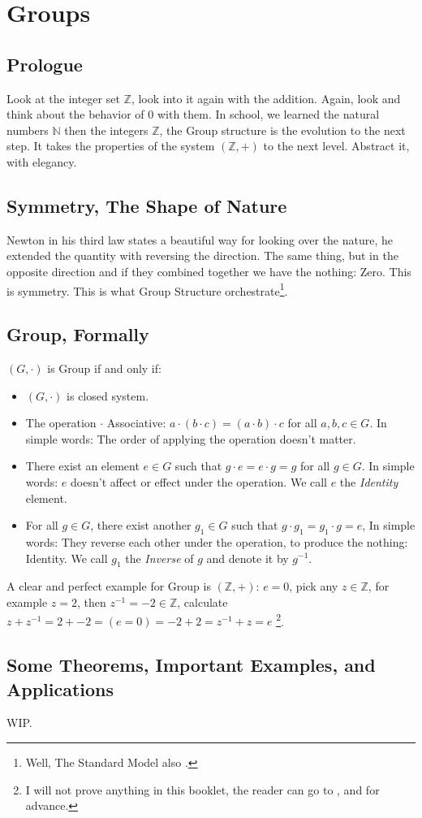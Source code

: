 \section{Groups \label{group}}
\subsection{Prologue}
Look at the integer set $\mathbb{Z}$, look into it again with the addition. Again, look and think about the behavior of $0$ with them. In school, we learned the natural numbers $\mathbb{N}$ then the integers $\mathbb{Z}$, the Group structure is the evolution to the next step. It takes the properties of the system $(\mathbb{Z},+)$ to the next level. Abstract it, with elegancy.

\subsection{Symmetry, The Shape of Nature}
Newton in his third law states a beautiful way for looking over the nature, he extended the quantity with reversing the direction. The same thing, but in the opposite direction and if they combined together we have the nothing: Zero. This is symmetry. This is what Group Structure orchestrate\footnote{Well, The Standard Model also \cite{enwiki:1038581383}.}.

\subsection{Group, Formally}

$(G,\cdot)$ is Group if and only if:
\begin{itemize}
   \item $(G,\cdot)$ is closed system.
   \item The operation $\cdot$ Associative: $a \cdot (b \cdot c) = (a \cdot b) \cdot c$ for all $a,b,c \in G$. In simple words: The order of applying the operation doesn't matter.
   \item There exist an element $e \in G$ such that $g \cdot e = e \cdot g = g$ for all $g \in G$. In simple words: $e$ doesn't affect or effect under the operation. We call $e$ the {\it Identity} element.
   \item For all $g \in G$, there exist another $g_1 \in G$ such that $g \cdot g_1 = g_1 \cdot g = e$, In simple words: They reverse each other under the operation, to produce the nothing: Identity. We call $g_1$ the {\it Inverse} of $g$ and denote it by $g^{-1}$.
\end{itemize}
A clear and perfect example for Group is $(\mathbb{Z},+)$: $e = 0$, pick any $z \in \mathbb{Z}$, for example $z = 2$, then $z^{-1}=-2 \in \mathbb{Z}$, calculate $z + z^{-1} = 2 + -2 = ( e = 0 ) = -2 + 2 = z^{-1} + z = e$ \footnote{I will not prove anything in this booklet, the reader can go to  \cite{fraleigh2003a}, and \cite{beardon2005algebra} for advance.}.

\subsection{Some Theorems, Important Examples, and Applications}
WIP.